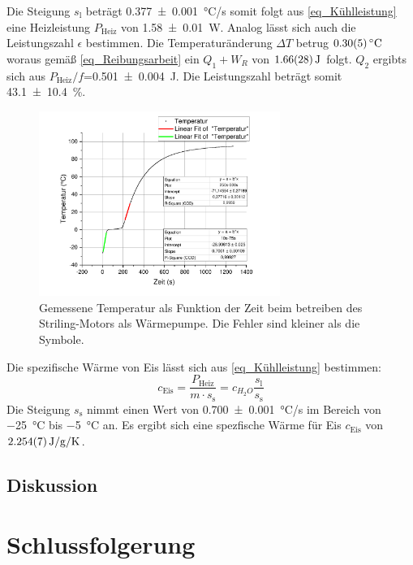 \documentclass[
	a4paper,
	12pt,
	pagesize,
	ngerman
]{scrartcl}
\begin{document}
	Die Steigung $s_\text{l}$ beträgt \SI{0,377+-0,001}{\degreeCelsius/s} somit folgt aus \cref{eq_Kühlleistung} eine Heizleistung $P_\text{Heiz}$ von \SI{1,58+-0,01}{W}.
	Analog lässt sich auch die Leistungszahl $\epsilon$ bestimmen. 
	Die Temperaturänderung $\Delta{T}$ betrug $\SI{0,3+-0,05}{\degreeCelsius}$ woraus gemäß \cref{eq_Reibungsarbeit} ein $Q_1+W_R$ von $\SI{1,66+-0,28}{J}$ folgt. 
	$Q_2$ ergibts sich aus $P_\text{Heiz}/f$=\SI{0,501+-0,004}{J}. %
	Die Leistungszahl beträgt somit \SI{43,1+-10,4}{\%}.
	\begin{figure}[H]
		\includegraphics[width=0.7\textwidth]{Waerm}
		\centering
		\caption{Gemessene Temperatur als Funktion der Zeit beim betreiben des Striling-Motors als Wärmepumpe. Die Fehler sind kleiner als die Symbole.}
		\label{fig_Waerm}
		\centering
	\end{figure}
	Die spezifische Wärme von Eis lässt sich aus \cref{eq_Kühlleistung} bestimmen:
	\begin{equation}
		c_\text{Eis} = \frac{P_\text{Heiz}}{m \cdot s_\text{s}} = c_{H_2O} \frac{s_\text{l}}{s_\text{s}}
	\end{equation} 
	Die Steigung $s_\text{s}$ nimmt einen Wert von \SI{0,700+-0,001}{\degreeCelsius/s} im Bereich von \SI{-25}{\degreeCelsius} bis \SI{-5}{\degreeCelsius} an. 
	Es ergibt sich eine spezfische Wärme für Eis $c_\text{Eis}$ von $\SI{2,254+-0,007}{J/g/K}$.
	\subsection{Diskussion}
	
	
	\section{Schlussfolgerung}
	
\end{document}
